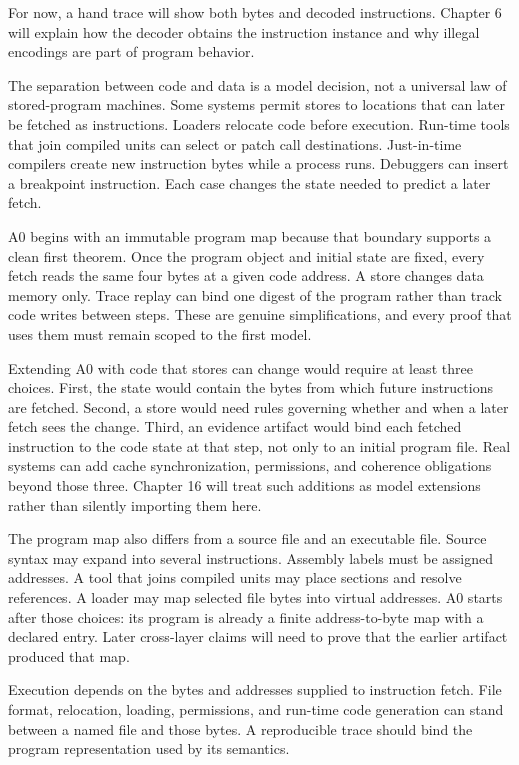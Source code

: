 For now, a hand trace will show both bytes and decoded instructions. Chapter 6
will explain how the decoder obtains the instruction instance and why illegal
encodings are part of program behavior.

The separation between code and data is a model decision, not a universal law
of stored-program machines. Some systems permit stores to locations that can
later be fetched as instructions. Loaders relocate code before execution.
Run-time tools that join compiled units can select or patch call destinations. Just-in-time compilers
create new instruction bytes while a process runs. Debuggers can insert a
breakpoint instruction. Each case changes the state needed to predict a later
fetch.

A0 begins with an immutable program map because that boundary supports a clean
first theorem. Once the program object and initial state are fixed, every
fetch reads the same four bytes at a given code address. A store changes data
memory only. Trace replay can bind one digest of the program rather than track
code writes between steps. These are genuine simplifications, and every proof
that uses them must remain scoped to the first model.

Extending A0 with code that stores can change would require at least three choices. First,
the state would contain the bytes from which future instructions are fetched.
Second, a store would need rules governing whether and when a later fetch sees
the change. Third, an evidence artifact would bind each fetched instruction to
the code state at that step, not only to an initial program file. Real systems
can add cache synchronization, permissions, and coherence obligations beyond
those three. Chapter 16 will treat such additions as model extensions rather
than silently importing them here.

The program map also differs from a source file and an executable file. Source
syntax may expand into several instructions. Assembly labels must be assigned
addresses. A tool that joins compiled units may place sections and resolve
references. A loader may
map selected file bytes into virtual addresses. A0 starts after those choices:
its program is already a finite address-to-byte map with a declared entry.
Later cross-layer claims will need to prove that the earlier artifact produced
that map.

\begin{warning}[title={The same file does not imply the same fetched program}]
Execution depends on the bytes and addresses supplied to instruction fetch.
File format, relocation, loading, permissions, and run-time code generation
can stand between a named file and those bytes. A reproducible trace should
bind the program representation used by its semantics.
\end{warning}

